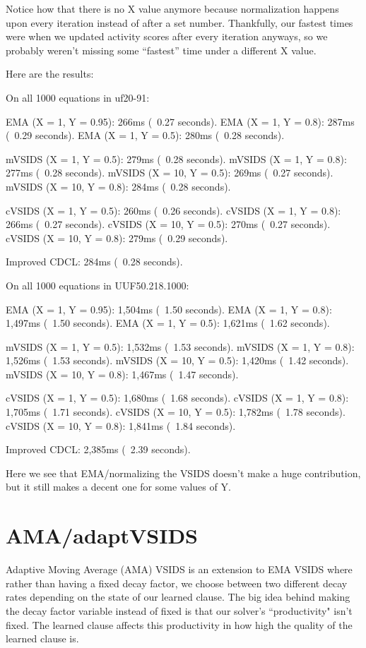 \noindent
Notice how that there is no X value anymore because normalization happens upon 
every iteration instead of after a set number. Thankfully, our fastest times were 
when we updated activity scores after every iteration anyways, so we probably weren't 
missing some ``fastest'' time under a different X value.

Here are the results:
\begin{FVerbatim}
On all 1000 equations in uf20-91:

EMA (X = 1, Y = 0.95):      266ms (~0.27 seconds).
EMA (X = 1, Y = 0.8):       287ms (~0.29 seconds).
EMA (X = 1, Y = 0.5):       280ms (~0.28 seconds).

mVSIDS (X = 1, Y = 0.5):    279ms (~0.28 seconds).
mVSIDS (X = 1, Y = 0.8):    277ms (~0.28 seconds).
mVSIDS (X = 10, Y = 0.5):   269ms (~0.27 seconds).
mVSIDS (X = 10, Y = 0.8):   284ms (~0.28 seconds).

cVSIDS (X = 1, Y = 0.5):    260ms (~0.26 seconds).
cVSIDS (X = 1, Y = 0.8):    266ms (~0.27 seconds).
cVSIDS (X = 10, Y = 0.5):   270ms (~0.27 seconds).
cVSIDS (X = 10, Y = 0.8):   279ms (~0.29 seconds).

Improved CDCL:              284ms (~0.28 seconds).

On all 1000 equations in UUF50.218.1000:

EMA (X = 1, Y = 0.95):      1,504ms (~1.50 seconds).
EMA (X = 1, Y = 0.8):       1,497ms (~1.50 seconds).
EMA (X = 1, Y = 0.5):       1,621ms (~1.62 seconds).

mVSIDS (X = 1, Y = 0.5):    1,532ms (~1.53 seconds).
mVSIDS (X = 1, Y = 0.8):    1,526ms (~1.53 seconds).
mVSIDS (X = 10, Y = 0.5):   1,420ms (~1.42 seconds).
mVSIDS (X = 10, Y = 0.8):   1,467ms (~1.47 seconds).

cVSIDS (X = 1, Y = 0.5):    1,680ms (~1.68 seconds).
cVSIDS (X = 1, Y = 0.8):    1,705ms (~1.71 seconds).
cVSIDS (X = 10, Y = 0.5):   1,782ms (~1.78 seconds).
cVSIDS (X = 10, Y = 0.8):   1,841ms (~1.84 seconds).

Improved CDCL:              2,385ms (~2.39 seconds).
\end{FVerbatim}
\noindent
Here we see that EMA/normalizing the VSIDS doesn't make a huge contribution,
but it still makes a decent one for some values of Y.

\section{AMA/adaptVSIDS}

Adaptive Moving Average (AMA) VSIDS is an extension to EMA VSIDS where rather than 
having a fixed decay factor, we choose between two different decay rates depending on 
the state of our learned clause. The big idea behind making the decay factor variable 
instead of fixed is that our solver's ``productivity" isn't fixed. The learned clause 
affects this productivity in how high the quality of the learned clause is. 


